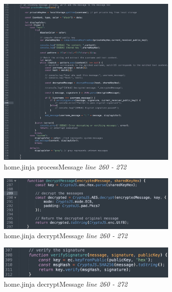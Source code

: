 \documentclass[12pt]{article}
\begin{document}
\begin{enumerate}
            \begin{figure}[H]
                \centering
                \includegraphics[width=0.8\textwidth]{graphs/processData.jpg}
                \caption{home.jinja processMessage \textit{line 260 - 272}}
                \label{processMessage}
            \end{figure}

            \begin{figure}[H]
                \centering
                \includegraphics[width=0.8\textwidth]{graphs/decrypt_message.jpg}
                \caption{home.jinja decryptMessage \textit{line 260 - 272}}
                \label{decryptMessage}
            \end{figure}

            \begin{figure}[H]
                \centering
                \includegraphics[width=0.8\textwidth]{graphs/verify_signature.jpg}
                \caption{home.jinja decryptMessage \textit{line 260 - 272}}
                \label{verify signature}
            \end{figure}


\end{enumerate}
\end{document}
